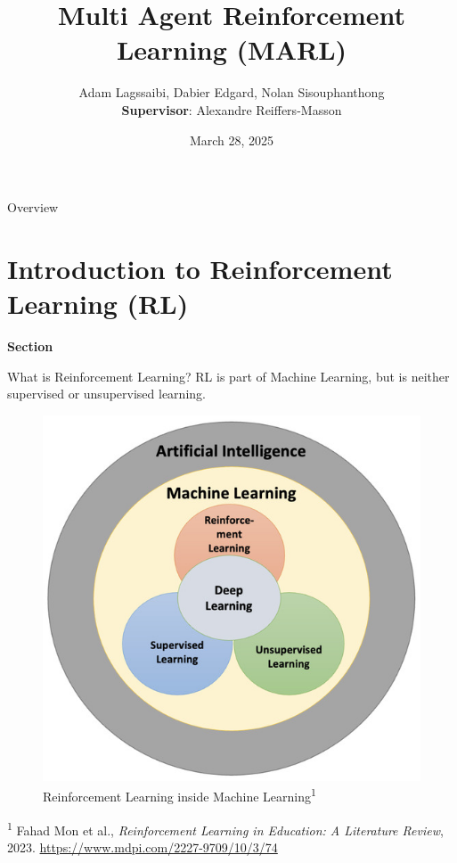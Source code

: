 \documentclass[aspectratio=169,xcolor=dvipsnames]{beamer}
\title{Multi Agent Reinforcement Learning (MARL)}
\author{Adam Lagssaibi, Dabier Edgard, Nolan Sisouphanthong\\
    \small \textbf{Supervisor}: Alexandre Reiffers-Masson}
\institute
{
    Project on recent advance in machine learning \\
    IMT Atlantique
}
\date{March 28, 2025} %
\begin{document}
\begin{frame}
    \titlepage
\end{frame}


\begin{frame}{Overview}
    \tableofcontents
\end{frame}

\section{Introduction to Reinforcement Learning (RL)}

\begin{frame}[plain]
    \vspace{0.15\textheight}
    \begin{center}
        {\bfseries Section \thesection} 
        
        \vspace{0.5cm} 
        
        {\Large\bfseries\insertsectionhead} 
    \end{center}
\end{frame}

\begin{frame}{What is Reinforcement Learning?}
    RL is part of Machine Learning, but is neither supervised or unsupervised learning.
    \begin{figure}[h]
    \centering
    \includegraphics[scale=0.35]{images/RL_in_ML.jpg}
    \caption{Reinforcement Learning inside Machine Learning\textsuperscript{1}}
    \end{figure}
    \vspace{-5pt}
    \footnotesize \tiny \textsuperscript{1} Fahad Mon et al., \textit{Reinforcement Learning in Education: A Literature Review}, 2023. \url{https://www.mdpi.com/2227-9709/10/3/74}
\end{frame}
\end{document}
